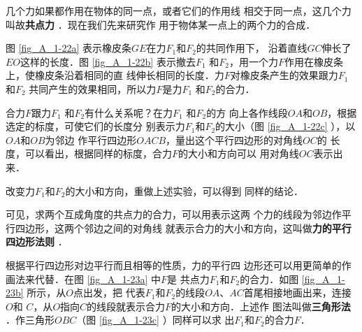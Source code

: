    几个力如果都作用在物体的同一点，或者它们的作用线
相交于同一点，这几个力叫故\textbf{共点力} ．现在我们先来研究作
用于物体某一点上的两个力的合成．

    图 \ref{fig_A_1-22a} 表示橡皮条$GE$在力$F_1$和$F_2$的共同作用下，
沿着直线$GC$伸长了$EO$这样的长度．图 \ref{fig_A_1-22b} 表示撤去$F_1$
和$F_2$，用一个力$F$作用在橡皮条上，使橡皮条沿着相同的直
线伸长相同的长度．力$F$对橡皮条产生的效果跟力$F_1$
和$F_2$
共同产生的效果相同，所以力$F$是力$F_1$
和$F_2$的合力．




    合力$F$跟力$F_1$
和$F_2$有什么关系呢？在力$F_1$
和$F_2$的方
向上各作线段$OA$和$OB$，根据选定的标度，可使它们的长度分
别表示力$F_1$和$F_2$的大小（图 \ref{fig_A_1-22c} ），以$OA$和$OB$为邻边
作平行四边形$OACB$，量出这个平行四边形的对角线$OC$的
长度，可以看出，根据同样的标度，合力$F$的大小和方向可以
用对角线$OC$表示出来．

    改变力$F_1$和$F_2$的大小和方向，重做上述实验，可以得到
同样的结论．

    可见，求两个互成角度的共点力的合力，可以用表示这两
个力的线段为邻边作平行四边形，这两个邻边之间的对角线
就表示合力的大小和方向，这叫做\textbf{力的平行四边形法则} ．

    根据平行四边形对边平行而且相等的性质，力的平行四
边形还可以用更简单的作画法来代替．在图 \ref{fig_A_1-23a} 中$F$是
共点力$F_1$和$F_2$的合力．如图 \ref{fig_A_1-23b} 所示，从$O$点出发，把
代表$F_1$和$F_2$的线段$OA$、$AC$首尾相接地画出来，连接$O$和
$C$，从$O$指向$C$的线段就表示合力$F$的大小和方向．上述作
图法叫做\textbf{三角形法} ．作三角形$OBC$（图 \ref{fig_A_1-23c} ）同样可以求
出$F_1$和$F_2$的合力$F$．

